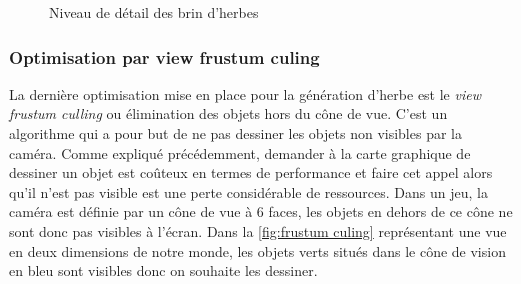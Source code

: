\begin{figure}[H]
	\begin{center}
	\end{center}
	\caption{Niveau de détail des brin d'herbes}
	\label{fig:brin_herbe_lod}
\end{figure}

\subsubsection{Optimisation par \og view frustum culing\fg}

La dernière optimisation mise en place pour la génération d'herbe est le \textit{view frustum culling} ou élimination des objets hors du cône de vue. C'est un algorithme qui a pour but de ne pas dessiner les objets non visibles par la caméra. Comme expliqué précédemment, demander à la carte graphique de dessiner un objet est coûteux en termes de performance et faire cet appel alors qu'il n'est pas visible est une perte considérable de ressources. 
Dans un jeu, la caméra est définie par un cône de vue à 6 faces, les objets en dehors de ce cône ne sont donc pas visibles à l'écran. Dans la \autoref{fig:frustum culing} représentant une vue en deux dimensions de notre monde, les objets verts situés dans le cône de vision en bleu sont visibles donc on souhaite les dessiner.



